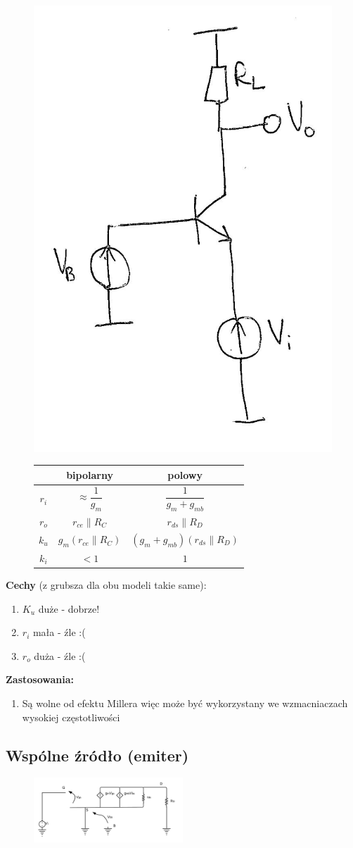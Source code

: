\documentclass[10pt,a4paper]{article}
\begin{document}
\begin{figure}[H]
\centering
\includegraphics[height=0.3\textwidth]{WB.png}
\begin{tabular}{c|c|c}
& bipolarny & polowy \\
\hline
$r_i$ & $\approx \dfrac{1}{g_m}$ & $ \dfrac{1}{g_m + g_{mb}}$ \\ 

$r_o$ & $r_{ce}\parallel R_C$ & $r_{ds} \parallel R_D $\\ 

$k_u$ & $g_m (r_{ce}\parallel R_C)$ & $(g_m + g_{mb})(r_{ds}\parallel R_D)$  \\ 

$k_i$ & $<1$ & $1$  \\ 

\end{tabular} 
\end{figure}


\textbf{Cechy} (z grubsza dla obu modeli takie same):
\begin{enumerate}
	\item \textbf{$K_u$} duże - dobrze!
	\item \textbf{$r_i$} mała - źle :(
	\item \textbf{$r_o$} duża - źle :(
\end{enumerate}
\textbf{Zastosowania:}
\begin{enumerate}
	\item Są wolne od efektu Millera więc może być wykorzystany we wzmacniaczach wysokiej częstotliwości
\end{enumerate}

\subsection{Wspólne źródło (emiter)}


\begin{figure}[H]
\centering
\includegraphics[width=0.5\textwidth]{CS.png}
\end{figure}
\end{document}
